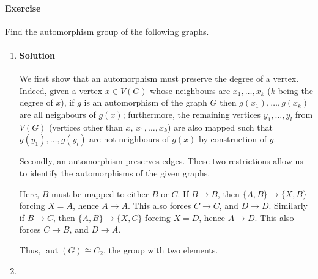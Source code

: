\documentclass[10pt]{article}
\newcounter{prob}
\newcommand{\problem}{\stepcounter{prob}\paragraph{Exercise \arabic{prob}}}
\newcommand{\solution}{\paragraph{Solution}}
\DeclareMathOperator{\aut}{aut}
\begin{document}
    
    \problem Find the automorphism group of the following graphs.
    \begin{enumerate}
        \item \mbox{}
        \begin{center}
        \end{center}

        \solution We first show that an automorphism must preserve the degree of a
        vertex. Indeed, given a vertex $x \in V(G)$ whose neighbours are $x_1, \dots,
        x_k$ ($k$ being the degree of $x$), if $g$ is an automorphism of the graph
        $G$ then $g(x_1), \dots, g(x_k)$ are all neighbours of $g(x)$; furthermore,
        the remaining vertices $y_1, \dots, y_l$ from $V(G)$ (vertices other than
        $x$, $x_1, \dots, x_k$) are also mapped such that $g(y_1), \dots, g(y_l)$ are
        not neighbours of $g(x)$ by construction of $g$.

        Secondly, an automorphism preserves edges. These two restrictions allow us to
        identify the automorphisms of the given graphs.

        Here, $B$ must be mapped to either $B$ or $C$. If $B \to B$, then $\{A, B\}
        \to \{X, B\}$ forcing $X = A$, hence $A \to A$. This also forces $C \to C$,
        and $D \to D$. Similarly if $B \to C$, then $\{A, B\} \to \{X, C\}$ forcing
        $X = D$, hence $A \to D$. This also forces $C \to B$, and $D \to A$.

        Thus, $\aut(G) \cong C_2$, the group with two elements.
        


        \item \mbox{}
        \begin{center}
\end{center}
\end{enumerate}
\end{document}
